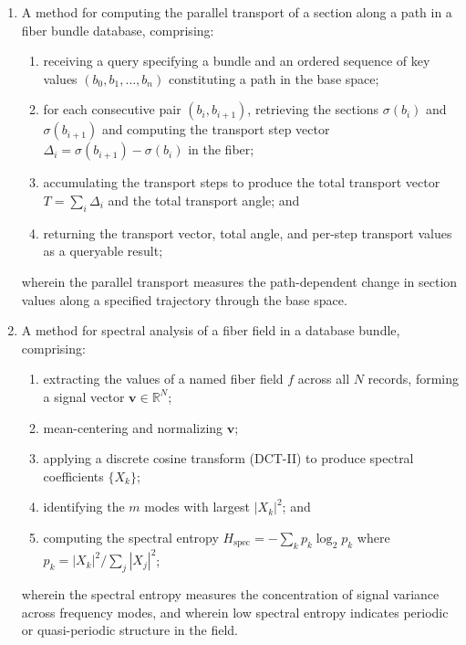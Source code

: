 \documentclass[11pt,letterpaper]{article}
\begin{document}
\begin{enumerate}
\item A method for computing the parallel transport of a section along a path in a fiber bundle database, comprising:
\begin{enumerate}[label=(\alph*)]
  \item receiving a query specifying a bundle and an ordered sequence of key values $(b_0, b_1, \ldots, b_n)$ constituting a path in the base space;
  \item for each consecutive pair $(b_i, b_{i+1})$, retrieving the sections $\sigma(b_i)$ and $\sigma(b_{i+1})$ and computing the transport step vector $\Delta_i = \sigma(b_{i+1}) - \sigma(b_i)$ in the fiber;
  \item accumulating the transport steps to produce the total transport vector $T = \sum_i \Delta_i$ and the total transport angle; and
  \item returning the transport vector, total angle, and per-step transport values as a queryable result;
\end{enumerate}
wherein the parallel transport measures the path-dependent change in section values along a specified trajectory through the base space.

\item A method for spectral analysis of a fiber field in a database bundle, comprising:
\begin{enumerate}[label=(\alph*)]
  \item extracting the values of a named fiber field $f$ across all $N$ records, forming a signal vector $\mathbf{v} \in \mathbb{R}^N$;
  \item mean-centering and normalizing $\mathbf{v}$;
  \item applying a discrete cosine transform (DCT-II) to produce spectral coefficients $\{X_k\}$;
  \item identifying the $m$ modes with largest $|X_k|^2$; and
  \item computing the spectral entropy $H_{\mathrm{spec}} = -\sum_k p_k \log_2 p_k$ where $p_k = |X_k|^2 / \sum_j |X_j|^2$;
\end{enumerate}
wherein the spectral entropy measures the concentration of signal variance across frequency modes, and wherein low spectral entropy indicates periodic or quasi-periodic structure in the field.


\end{enumerate}
\end{document}

